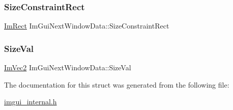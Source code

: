 \subsubsection{\texorpdfstring{Size\+Constraint\+Rect}{SizeConstraintRect}}
{\footnotesize\ttfamily \mbox{\hyperlink{struct_im_rect}{Im\+Rect}} Im\+Gui\+Next\+Window\+Data\+::\+Size\+Constraint\+Rect}

\mbox{\label{struct_im_gui_next_window_data_af399c9c679b8f9c315af8583bf63aa68}} 
\subsubsection{\texorpdfstring{Size\+Val}{SizeVal}}
{\footnotesize\ttfamily \mbox{\hyperlink{struct_im_vec2}{Im\+Vec2}} Im\+Gui\+Next\+Window\+Data\+::\+Size\+Val}



The documentation for this struct was generated from the following file\+:\begin{DoxyCompactItemize}
\item 
\mbox{\hyperlink{imgui__internal_8h}{imgui\+\_\+internal.\+h}}\end{DoxyCompactItemize}
